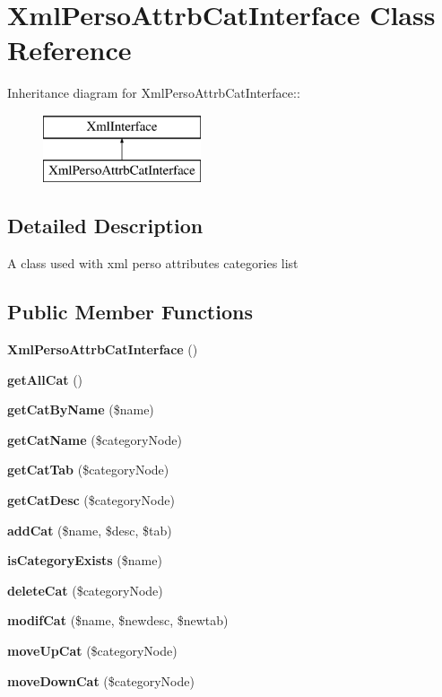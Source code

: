 \section{Xml\-Perso\-Attrb\-Cat\-Interface Class Reference}
\label{classXmlPersoAttrbCatInterface}
Inheritance diagram for Xml\-Perso\-Attrb\-Cat\-Interface::\begin{figure}[H]
\begin{center}
\leavevmode
\includegraphics[height=2cm]{classXmlPersoAttrbCatInterface}
\end{center}
\end{figure}


\subsection{Detailed Description}
A class used with xml perso attributes categories list 

\subsection*{Public Member Functions}
\begin{CompactItemize}
\item 
{\bf Xml\-Perso\-Attrb\-Cat\-Interface} ()
\item 
{\bf get\-All\-Cat} ()
\item 
{\bf get\-Cat\-By\-Name} (\$name)
\item 
{\bf get\-Cat\-Name} (\$category\-Node)
\item 
{\bf get\-Cat\-Tab} (\$category\-Node)
\item 
{\bf get\-Cat\-Desc} (\$category\-Node)
\item 
{\bf add\-Cat} (\$name, \$desc, \$tab)
\item 
{\bf is\-Category\-Exists} (\$name)
\item 
{\bf delete\-Cat} (\$category\-Node)
\item 
{\bf modif\-Cat} (\$name, \$newdesc, \$newtab)
\item 
{\bf move\-Up\-Cat} (\$category\-Node)
\item 
{\bf move\-Down\-Cat} (\$category\-Node)
\end{CompactItemize}


